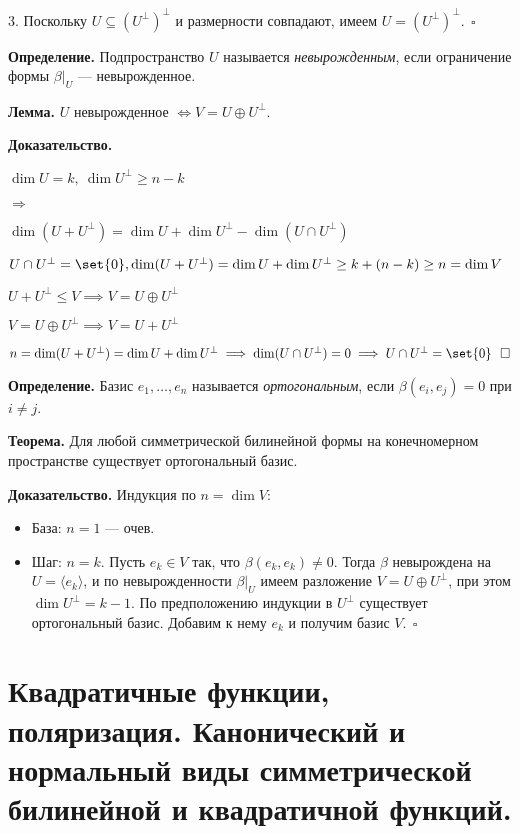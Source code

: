 \documentclass[12pt]{article}
\begin{document}
3. Поскольку $ U \subseteq (U^\perp)^\perp $ и размерности совпадают, имеем $ U = (U^\perp)^\perp. \ \ \square$


\textbf{Определение.} Подпространство $U$ называется \textit{невырожденным}, если ограничение формы $\beta|_U$ — невырожденное.

\textbf{Лемма.} $U$ невырожденное $\iff V = U \oplus U^\perp$.

\textbf{Доказательство.}

$\dim U = k, \ \dim U^\perp \geq n-k$

$\Longrightarrow$

$\dim (U+U^\perp)=\dim U + \dim U^\perp - \dim (U \cap U^\perp)$

$U \cap U^\perp = \set {0}, \dim(U+U^\perp)=\dim U+\dim U^\perp \geq k + (n-k) \geq n = \dim V$

$U+U^\perp \leq V \implies V = U \oplus U^\perp$

\Longleftarrow

$V = U \oplus U^\perp \implies V = U + U^\perp$

$n = \dim (U+U^\perp) = \dim U + \dim U^\perp \implies \dim(U \cap U^\perp)=0 \implies U \cap U^\perp = \set{0} \ \ \square$

\textbf{Определение.} Базис $e_1, \dots, e_n$ называется \textit{ортогональным}, если $\beta(e_i, e_j) = 0$ при $i \ne j$.

\textbf{Теорема.} Для любой симметрической билинейной формы на конечномерном пространстве существует ортогональный базис.

\textbf{Доказательство.} Индукция по $n = \dim V$:
\begin{itemize}
    \item База: $n = 1$ — очев.
    \item Шаг: $n = k$. Пусть $e_k \in V$ так, что $\beta(e_k, e_k) \ne 0$. Тогда $\beta$ невырождена на $U = \langle e_k \rangle$, и по невырожденности $\beta|_U$ имеем разложение $V = U \oplus U^\perp$, при этом $\dim U^\perp=k-1$. По предположению индукции в $U^\perp$ существует ортогональный базис. Добавим к нему $e_k$ и получим базис $V$.$\ \ \square$
\end{itemize}

\section{Квадратичные функции, поляризация. Канонический и нормальный виды симметрической билинейной и квадратичной функций.}
\end{document}
